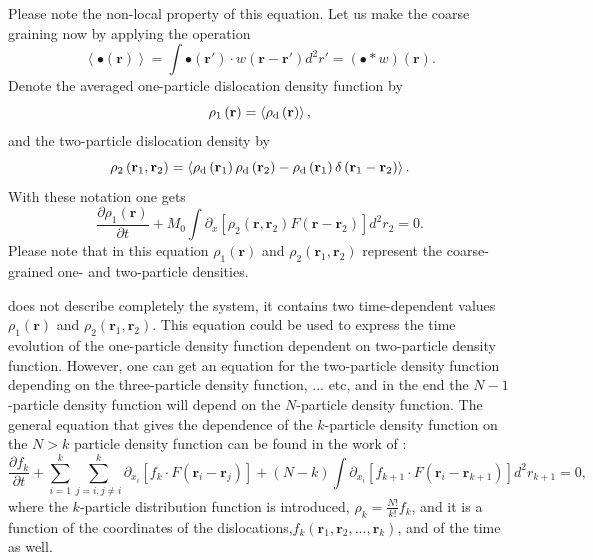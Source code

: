 Please note the non-local property of this equation. Let us make the coarse graining now by applying the operation
\begin{equation}
\left\langle { \bullet \left( {\mathbf{r}} \right)} \right\rangle  = \int { \bullet \left( {{\mathbf{r}}'} \right) \cdot w\left( {{\mathbf{r}} - {\mathbf{r}}'} \right){d^2}r'}  = \left( { \bullet  * w} \right)\left( {\mathbf{r}} \right).
\end{equation}
Denote the averaged one-particle dislocation density function by
\begin{equation} \label{eq:intro_one_particle}
{\rho _1}\left( {\mathbf{r}} \right) = \left\langle {{\rho _{\rm{d}}}\left( {\mathbf{r}} \right)} \right\rangle,
\end{equation}
and the two-particle dislocation density by 
\begin{equation} \label{eq:intro_two_particle}
{\rho _2}\left( {{{\mathbf{r}}_1},{{\mathbf{r}}_2}} \right) = \left\langle {{\rho _{\rm{d}}}\left( {{{\mathbf{r}}_1}} \right){\rho _{\rm{d}}}\left( {{{\mathbf{r}}_2}} \right) - {\rho _{\rm{d}}}\left( {{{\mathbf{r}}_1}} \right)\delta \left( {{{\mathbf{r}}_1} - {{\mathbf{r}}_2}} \right)} \right\rangle.
\end{equation}
With these notation one gets
\begin{equation} \label{eq:one_two_particle_EOM}
\frac{{\partial {\rho _1}\left( {\mathbf{r}} \right)}}{{\partial t}} + M_0 \int {{\partial _x}\left[ {{\rho _2}\left( {{\mathbf{r}},{{\mathbf{r}}_2}} \right)F\left( {{\mathbf{r}} - {{\mathbf{r}}_2}} \right)} \right]{d^2}{r_2} = 0}.
\end{equation}
Please note that in this equation ${\rho _1}\left( {\mathbf{r}} \right)$ and ${\rho _2}\left( {{{\mathbf{r}}_1},{{\mathbf{r}}_2}} \right)$ represent the coarse-grained one- and two-particle densities.

 does not describe completely the system, it contains two time-dependent values ${\rho _1}\left( {\mathbf{r}} \right)$ and ${\rho _2}\left( {{{\mathbf{r}}_1},{{\mathbf{r}}_2}} \right)$. This equation could be used to express the time evolution of the one-particle density function dependent on two-particle density function. However, one can get an equation for the two-particle density function depending on the three-particle density function, ... etc, and in the end the $N-1$-particle density function will depend on the $N$-particle density function. The general equation that gives the dependence of the $k$-particle density function on the $N>k$ particle density function can be found in the work of \citet{Groma_1997_PRB}:
\[\frac{{\partial {f_k}}}{{\partial t}} + \sum\limits_{i = 1}^k {\sum\limits_{j = i,j \ne i}^k {{\partial _{{x_i}}}\left[ {{f_k} \cdot F\left( {{{\mathbf{r}}_i} - {{\mathbf{r}}_j}} \right)} \right]} }  + \left( {N - k} \right)\int {{\partial _{{x_i}}}\left[ {{f_{k + 1}} \cdot F\left( {{{\mathbf{r}}_i} - {{\mathbf{r}}_{k+1}}} \right)} \right]d^2{r_{k + 1}}}  = 0,\]
where the $k$-particle distribution function is introduced, ${\rho _k} = \frac{{N!}}{{k!}}{f_k}$, and it is a function of the coordinates of the dislocations,${f_k}\left( {{{\mathbf{r}}_1},{{\mathbf{r}}_2},...,{{\mathbf{r}}_k}} \right)$, and of the time as well.

